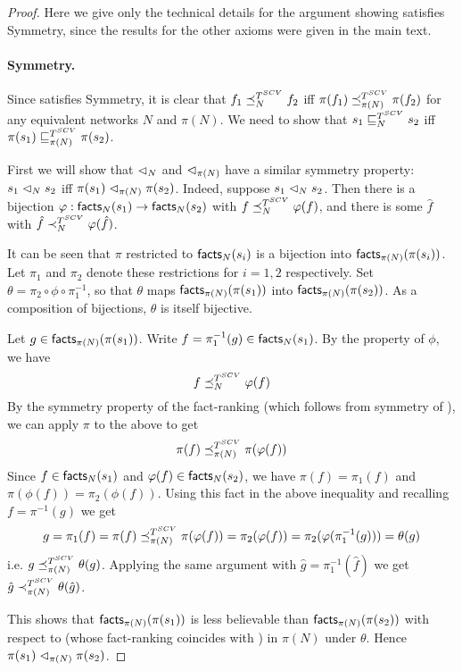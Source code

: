 \begin{proof}

Here we give only the technical details for the argument showing \scvoting{}
satisfies Symmetry, since the results for the other axioms were given in the
main text.

\paragraph{Symmetry.}
Since \voting{} satisfies Symmetry, it is clear that $f_1 \preceq_N^{T^{SCV}} f_2$
iff $\pi(f_1) \preceq_{\pi(N)}^{T^{SCV}} \pi(f_2)$ for any equivalent networks $N$
and $\pi(N)$. We need to show that $s_1 \sqsubseteq_N^{T^{SCV}} s_2$ iff $\pi(s_1)
\sqsubseteq_{\pi(N)}^{T^{SCV}} \pi(s_2)$.

First we will show that $\mathrel{\lhd}_N$ and $\mathrel{\lhd}_{\pi(N)}$ have a similar symmetry
property: $s_1 \mathrel{\lhd}_N s_2$ iff $\pi(s_1) \mathrel{\lhd}_{\pi(N)} \pi(s_2)$. Indeed,
suppose $s_1 \mathrel{\lhd}_N s_2$. Then there is a bijection $\varphi: \mathsf{facts}_N(s_1) \to
\mathsf{facts}_N(s_2)$ with $f \preceq_N^{T^{SCV}} \varphi(f)$, and there is some $\hat{f}$
with $\hat{f} \prec_N^{T^{SCV}} \varphi(\hat{f})$.

It can be seen that $\pi$ restricted to $\mathsf{facts}_N(s_i)$ is a bijection into
$\mathsf{facts}_{\pi(N)}(\pi(s_i))$. Let $\pi_1$ and $\pi_2$ denote these restrictions
for $i=1, 2$ respectively. Set $\theta = \pi_2 \circ \phi \circ \pi_1^{-1}$, so
that $\theta$ maps $\mathsf{facts}_{\pi(N)}(\pi(s_1))$ into
$\mathsf{facts}_{\pi(N)}(\pi(s_2))$. As a composition of bijections, $\theta$ is itself
bijective.

Let $g \in \mathsf{facts}_{\pi(N)}(\pi(s_1))$. Write $f = \pi_1^{-1}(g) \in
\mathsf{facts}_N(s_1)$. By the property of $\phi$, we have
\[
    f \preceq_N^{T^{SCV}} \varphi(f)
\]
By the symmetry property of the fact-ranking (which follows from symmetry of
\voting{}), we can apply $\pi$ to the above to get
\[
    \pi(f) \preceq_{\pi(N)}^{T^{SCV}} \pi(\varphi(f))
\]
Since $f \in \mathsf{facts}_N(s_1)$ and $\varphi(f) \in \mathsf{facts}_N(s_2)$, we have $\pi(f) =
\pi_1(f)$ and $\pi(\phi(f)) = \pi_2(\phi(f))$. Using this fact in the above
inequality and recalling $f = \pi^{-1}(g)$ we get
\[
    g = \pi_1(f) = \pi(f)
    \preceq_{\pi(N)}^{T^{SCV}}
    \pi(\varphi(f)) = \pi_2(\varphi(f)) = \pi_2(\varphi(\pi_1^{-1}(g))) = \theta(g)
\]
i.e. $g \preceq_{\pi(N)}^{T^{SCV}} \theta(g)$. Applying the same argument with
$\hat{g} = \pi_1^{-1}(\hat{f})$ we get $\hat{g} \prec_{\pi(N)}^{T^{SCV}}
\theta(\hat{g})$.

This shows that $\mathsf{facts}_{\pi(N)}(\pi(s_1))$ is less believable than
$\mathsf{facts}_{\pi(N)}(\pi(s_2))$ with respect to \scvoting{} (whose fact-ranking
coincides with \voting{}) in $\pi(N)$ under $\theta$. Hence $\pi(s_1)
\mathrel{\lhd}_{\pi(N)} \pi(s_2)$.


\end{proof}

